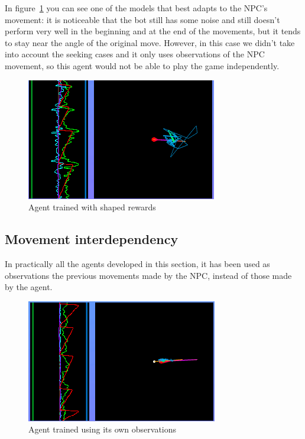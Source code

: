 In figure~\ref{fig:axisbestCS} you can see one of the models that best adapts to the NPC's movement: it is noticeable that the bot still has some noise and still doesn't perform very well in the beginning and at the end of the movements, but it tends to stay near the angle of the original move. However, in this case we didn't take into account the seeking cases and it only uses observations of the NPC movement, so this agent would not be able to play the game independently.

\begin{figure}[h]
  \centering
		\includegraphics[width=.6\textwidth]{img/axisBestCS.png}
  \caption{Agent trained with shaped rewards}
  \label{fig:axisbestCS}
\end{figure}

\subsection{Movement interdependency} %

In practically all the agents developed in this section, it has been used as observations the previous movements made by the NPC, instead of those made by the agent. 

\begin{figure}[h]
  \centering
		\includegraphics[width=.6\textwidth]{img/axisInterdep.png}
  \caption{Agent trained using its own observations}
  \label{fig:axisInterdep}
\end{figure}

